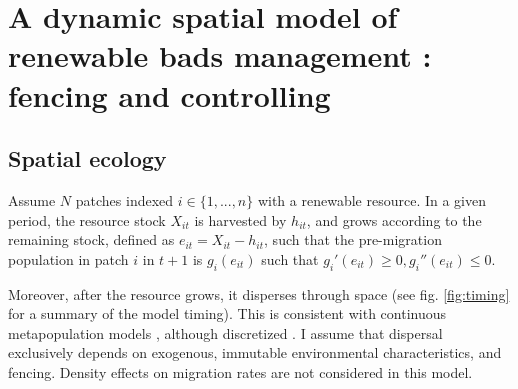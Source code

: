 
\section{A dynamic spatial model of renewable bads management : fencing and controlling}
\label{sec:model}


\subsection{Spatial ecology}
Assume $N$ patches indexed $i\in \{1, ..., n\}$ with a renewable resource. In a given period, the resource stock $X_{it}$ is harvested by $h_{it}$, and grows according to the remaining stock, defined as $e_{it} = X_{it} - h_{it}$, such that the pre-migration population in patch $i$ in $t+1$ is $g_i(e_{it})$ such that $g_i'(e_{it})\geq0, g_i''(e_{it}) \leq 0$.

Moreover, after the resource grows, it disperses through space (see fig. \ref{fig:timing} for a summary of the model timing). This is consistent with continuous metapopulation models \citep{sanchirico_bioeconomics_1999, bulte_metapopulation_1999}, although discretized \citep{costello_private_2017}. I assume that dispersal exclusively depends on exogenous, immutable environmental characteristics, and fencing. Density effects on migration rates are not considered in this model.

